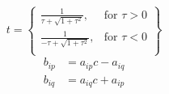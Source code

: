 \documentclass{article}
\begin{document}
	\[
	t = \left\{\begin{array}{lr}
	\frac{1}{\tau+\sqrt{1+\tau^{2}}}, & \text{for } \tau > 0\\
	\frac{1}{-\tau+\sqrt{1+\tau^{2}}}, & \text{for } \tau < 0\\
	\end{array}\right\}
	\]
\begin{align}
	b_{ip} &= a_{ip}c - a_{iq}\\
	b_{iq} &= a_{iq}c + a_{ip}\\
	
\end{align}
\end{document}
